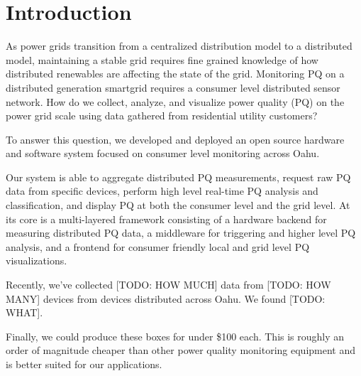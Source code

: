 \documentclass[conference]{IEEEtran}
\begin{document}




%
\IEEEpeerreviewmaketitle



\section{Introduction}
As power grids transition from a centralized distribution model to a distributed model, maintaining a stable grid requires fine grained knowledge of how distributed renewables are affecting the state of the grid. Monitoring PQ on a distributed generation smartgrid requires a consumer level distributed sensor network. How do we collect, analyze, and visualize power quality (PQ) on the power grid scale using data gathered from residential utility customers? 

To answer this question, we developed and deployed an open source hardware and software system focused on consumer level monitoring across Oahu. 

Our system is able to aggregate distributed PQ measurements, request raw PQ data from specific devices, perform high level real-time PQ analysis and classification, and display PQ at both the consumer level and the grid level. At its core is a multi-layered framework consisting of a hardware backend for measuring distributed PQ data, a middleware for triggering and higher level PQ analysis, and a frontend for consumer friendly local and grid level PQ visualizations.


Recently, we've collected [TODO: HOW MUCH] data from [TODO: HOW MANY] devices from devices distributed across Oahu. We found [TODO: WHAT].

Finally, we could produce these boxes for under \$100 each. This is roughly an order of magnitude cheaper than other power quality monitoring equipment and is better suited for our applications.
\end{document}
